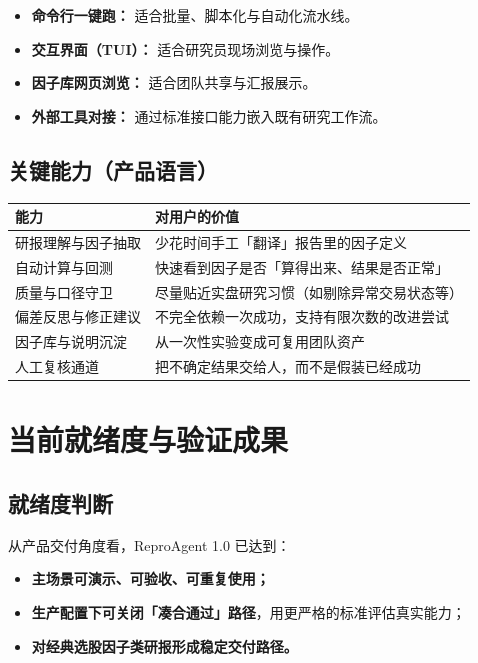 \documentclass[UTF8,a4paper,11pt]{ctexart}
\begin{document}
\begin{itemize}
  \item \textbf{命令行一键跑：} 适合批量、脚本化与自动化流水线。
  \item \textbf{交互界面（TUI）：} 适合研究员现场浏览与操作。
  \item \textbf{因子库网页浏览：} 适合团队共享与汇报展示。
  \item \textbf{外部工具对接：} 通过标准接口能力嵌入既有研究工作流。
\end{itemize}

\subsection{关键能力（产品语言）}

\begin{table}[h]
\centering
\renewcommand{\arraystretch}{1.2}
\begin{tabularx}{\textwidth}{@{}lX@{}}
\toprule
\textbf{能力} & \textbf{对用户的价值} \\
\midrule
研报理解与因子抽取 & 少花时间手工「翻译」报告里的因子定义 \\
自动计算与回测 & 快速看到因子是否「算得出来、结果是否正常」 \\
质量与口径守卫 & 尽量贴近实盘研究习惯（如剔除异常交易状态等） \\
偏差反思与修正建议 & 不完全依赖一次成功，支持有限次数的改进尝试 \\
因子库与说明沉淀 & 从一次性实验变成可复用团队资产 \\
人工复核通道 & 把不确定结果交给人，而不是假装已经成功 \\
\bottomrule
\end{tabularx}
\end{table}

\section{当前就绪度与验证成果}

\subsection{就绪度判断}

从产品交付角度看，ReproAgent 1.0 已达到：

\begin{itemize}
  \item \textbf{主场景可演示、可验收、可重复使用；}
  \item \textbf{生产配置下可关闭「凑合通过」路径}，用更严格的标准评估真实能力；
  \item \textbf{对经典选股因子类研报形成稳定交付路径。}
\end{itemize}
\end{document}
